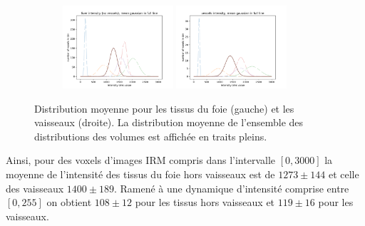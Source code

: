 \begin{figure}[!ht]
  \begin{subfigure}{\textwidth}
    \centering
    \includegraphics[width=0.45\textwidth]{Images/gen_mri_liver_mean_intensity.pdf}
    \includegraphics[width=0.45\textwidth]{Images/gen_mri_vessels_mean_intensity.pdf}
  \end{subfigure}
  \caption{Distribution moyenne pour les tissus du foie (gauche) et les vaisseaux (droite). La distribution moyenne de l'ensemble des distributions des volumes est affichée en traits pleins.}
  \label{fig:Distributions_mri_mean}
\end{figure}
Ainsi, pour des voxels d'images IRM compris dans l'intervalle $[0,3000]$ la moyenne de l'intensité des tissus du foie hors vaisseaux est de $1273 \pm 144$ et celle des vaisseaux $1400 \pm 189$. Ramené à une dynamique d'intensité comprise entre $[0, 255]$ on obtient $108 \pm 12$ pour les tissus hors vaisseaux et $119 \pm 16$ pour les vaisseaux. 
